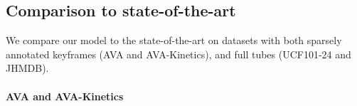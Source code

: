 \documentclass[10pt,twocolumn,letterpaper]{article}
\def \paravspace {-0.7\baselineskip}
\begin{document}
\subsection{Comparison to state-of-the-art}

We compare our model to the state-of-the-art on datasets with both sparsely annotated keyframes (AVA and AVA-Kinetics), and full tubes (UCF101-24 and JHMDB).

\vspace{\paravspace}
\paragraph{AVA and AVA-Kinetics}


\begin{table*}[t]
	\vspace{-0.5\baselineskip}
	\centering
	\caption{Comparison to the state-of-the-art (reported with mean Average Precision; mAP~$\uparrow$) on AVA~\cite{gu_cvpr_2018} and AVA-Kinetics~(AVA-K)~\cite{li2020ava}.
		For AVA, we use the latest v2.2 annotations.
		Methods using external proposals (i.e. not end-to-end) are also trained on additional object detection and human pose data.
		Unless otherwise stated, separate models are trained for AVA and AVA-Kinetics.
		$^{*}$ denotes the model was trained on AVA-Kinetics and evaluated on AVA.
		``Res.'' denotes the frame resolution of the shorter side.
	}
	\renewcommand{\arraystretch}{0.92}
\end{table*}
\end{document}

